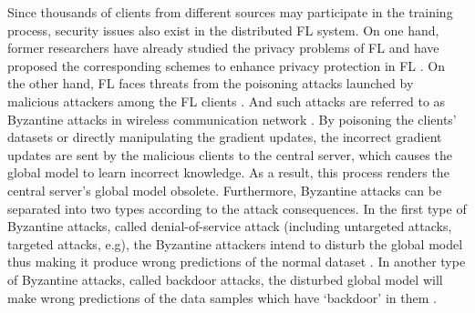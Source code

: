 \documentclass[lettersize,journal]{IEEEtran}
\begin{document}
\par Since thousands of clients from different sources may participate in the training process, security issues also exist in the distributed FL system. On one hand, former researchers have already studied the privacy problems of FL and have proposed the corresponding schemes to enhance privacy protection in FL \cite{ref_33_privacy, ref_34_VerifyNet, wang2019beyond}. On the other hand, FL faces threats from the poisoning attacks launched by malicious attackers among the FL clients \cite{miao2018attack, laishram2016curie}. And such attacks are referred to as Byzantine attacks in wireless communication network \cite{ref_36_Byzantine,ref_37_Byzantine,ref_38_Byzantine,ref_40_Byzantine}. By poisoning the clients' datasets or directly manipulating the gradient updates, the incorrect gradient updates are sent by the malicious clients to the central server, which causes the global model to learn incorrect knowledge. As a result, this process renders the central server's global model obsolete. Furthermore, Byzantine attacks can be separated into two types according to the attack consequences. In the first type of Byzantine attacks, called denial-of-service attack (including untargeted attacks, targeted attacks, e.g), the Byzantine attackers intend to disturb the global model thus making it produce wrong predictions of the normal dataset \cite{ref_04_model,ref_06_model,ref_07_data,yang2017generative,sun2018data}. In another type of Byzantine attacks, called backdoor attacks, the disturbed global model will make wrong predictions of the data samples which have `backdoor' in them \cite{ref_08_data,ref_09_backdoor,ref_10_backdoor,ref_11_backdoor,ref_19_backdoor}.
\end{document}
